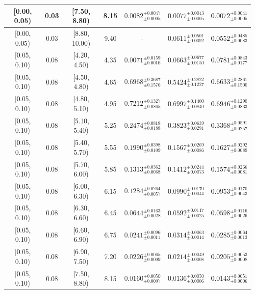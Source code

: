 \begin{longtable}{|c|c|c|c|c|c|c|}
\hline
[0.00, 0.05) & 0.03 & [7.50, 8.80) & 8.15 & $0.0082^{ \pm 0.0047 }_{ \pm 0.0005 }$ & $0.0077^{ \pm 0.0043 }_{ \pm 0.0005 }$ & $0.0072^{ \pm 0.0041 }_{ \pm 0.0005 }$ \\ 
\hline
[0.00, 0.05) & 0.03 & [8.80, 10.00) & 9.40 & - & $0.0611^{ \pm 0.0501 }_{ \pm 0.0092 }$ & $0.0552^{ \pm 0.0485 }_{ \pm 0.0083 }$ \\ 
\hline
[0.05, 0.10) & 0.08 & [4.20, 4.50) & 4.35 & $0.0071^{ \pm 0.0159 }_{ \pm 0.0016 }$ & $0.0663^{ \pm 0.0677 }_{ \pm 0.0150 }$ & $0.0781^{ \pm 0.0843 }_{ \pm 0.0177 }$ \\ 
\hline
[0.05, 0.10) & 0.08 & [4.50, 4.80) & 4.65 & $0.6968^{ \pm 0.3687 }_{ \pm 0.1576 }$ & $0.5424^{ \pm 0.2822 }_{ \pm 0.1227 }$ & $0.6633^{ \pm 0.2861 }_{ \pm 0.1500 }$ \\ 
\hline
[0.05, 0.10) & 0.08 & [4.80, 5.10) & 4.95 & $0.7212^{ \pm 0.1327 }_{ \pm 0.0865 }$ & $0.6997^{ \pm 0.1400 }_{ \pm 0.0840 }$ & $0.6946^{ \pm 0.1290 }_{ \pm 0.0833 }$ \\ 
\hline
[0.05, 0.10) & 0.08 & [5.10, 5.40) & 5.25 & $0.2474^{ \pm 0.0818 }_{ \pm 0.0188 }$ & $0.3823^{ \pm 0.0639 }_{ \pm 0.0291 }$ & $0.3368^{ \pm 0.0591 }_{ \pm 0.0257 }$ \\ 
\hline
[0.05, 0.10) & 0.08 & [5.40, 5.70) & 5.55 & $0.1990^{ \pm 0.0398 }_{ \pm 0.0109 }$ & $0.1567^{ \pm 0.0269 }_{ \pm 0.0086 }$ & $0.1627^{ \pm 0.0292 }_{ \pm 0.0089 }$ \\ 
\hline
[0.05, 0.10) & 0.08 & [5.70, 6.00) & 5.85 & $0.1313^{ \pm 0.0362 }_{ \pm 0.0068 }$ & $0.1412^{ \pm 0.0244 }_{ \pm 0.0073 }$ & $0.1574^{ \pm 0.0266 }_{ \pm 0.0081 }$ \\ 
\hline
[0.05, 0.10) & 0.08 & [6.00, 6.30) & 6.15 & $0.1284^{ \pm 0.0264 }_{ \pm 0.0057 }$ & $0.0990^{ \pm 0.0170 }_{ \pm 0.0044 }$ & $0.0953^{ \pm 0.0170 }_{ \pm 0.0043 }$ \\ 
\hline
[0.05, 0.10) & 0.08 & [6.30, 6.60) & 6.45 & $0.0644^{ \pm 0.0163 }_{ \pm 0.0028 }$ & $0.0592^{ \pm 0.0117 }_{ \pm 0.0025 }$ & $0.0598^{ \pm 0.0116 }_{ \pm 0.0026 }$ \\ 
\hline
[0.05, 0.10) & 0.08 & [6.60, 6.90) & 6.75 & $0.0241^{ \pm 0.0096 }_{ \pm 0.0011 }$ & $0.0314^{ \pm 0.0063 }_{ \pm 0.0014 }$ & $0.0285^{ \pm 0.0064 }_{ \pm 0.0013 }$ \\ 
\hline
[0.05, 0.10) & 0.08 & [6.90, 7.50) & 7.20 & $0.0226^{ \pm 0.0065 }_{ \pm 0.0009 }$ & $0.0214^{ \pm 0.0049 }_{ \pm 0.0008 }$ & $0.0205^{ \pm 0.0053 }_{ \pm 0.0008 }$ \\ 
\hline
[0.05, 0.10) & 0.08 & [7.50, 8.80) & 8.15 & $0.0160^{ \pm 0.0050 }_{ \pm 0.0007 }$ & $0.0136^{ \pm 0.0050 }_{ \pm 0.0006 }$ & $0.0143^{ \pm 0.0051 }_{ \pm 0.0006 }$ \\ 

\end{longtable}

